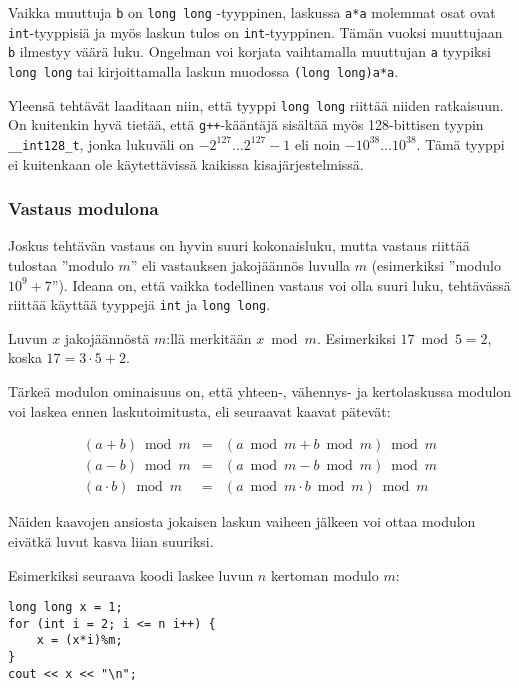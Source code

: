 Vaikka muuttuja \texttt{b} on \texttt{long long} -tyyppinen,
laskussa \texttt{a*a} molemmat osat ovat \texttt{int}-tyyppisiä
ja myös laskun tulos on \texttt{int}-tyyppinen.
Tämän vuoksi muuttujaan \texttt{b} ilmestyy väärä luku.
Ongelman voi korjata vaihtamalla muuttujan \texttt{a}
tyypiksi \texttt{long long} tai kirjoittamalla
laskun muodossa \texttt{(long long)a*a}.

Yleensä tehtävät laaditaan niin, että tyyppi
\texttt{long long} riittää niiden ratkaisuun.
On kuitenkin hyvä tietää, että \texttt{g++}-kääntäjä sisältää myös 128-bittisen
tyypin \texttt{\_\_int128\_t}, jonka lukuväli on
$-2^{127} \ldots 2^{127}-1$ eli noin $-10^{38} \ldots 10^{38}$.
Tämä tyyppi ei kuitenkaan ole käytettävissä kaikissa kisajärjestelmissä.

\subsubsection{Vastaus modulona}


Joskus tehtävän vastaus on hyvin suuri kokonaisluku,
mutta vastaus riittää tulostaa ''modulo $m$''
eli vastauksen jakojäännös luvulla $m$
(esimerkiksi ''modulo $10^9+7$'').
Ideana on, että vaikka todellinen vastaus
voi olla suuri luku,
tehtävässä riittää käyttää tyyppejä \texttt{int} ja \texttt{long long}.

Luvun $x$ jakojäännöstä $m$:llä
merkitään $x \bmod m$.
Esimerkiksi $17 \bmod 5 = 2$,
koska $17 = 3 \cdot 5 + 2$.

Tärkeä modulon ominaisuus on,
että yhteen-, vähennys- ja kertolaskussa
modulon voi laskea ennen laskutoimitusta,
eli seuraavat kaavat pätevät:

\[
\begin{array}{rcr}
(a+b) \bmod m & = & (a \bmod m + b \bmod m) \bmod m \\
(a-b) \bmod m & = & (a \bmod m - b \bmod m) \bmod m \\
(a \cdot b) \bmod m & = & (a \bmod m \cdot b \bmod m) \bmod m
\end{array}
\]

Näiden kaavojen ansiosta
jokaisen laskun vaiheen jälkeen voi ottaa modulon
eivätkä luvut kasva liian suuriksi.

Esimerkiksi seuraava koodi
laskee luvun $n$ kertoman modulo $m$:
\begin{lstlisting}
long long x = 1;
for (int i = 2; i <= n i++) {
    x = (x*i)%m;
}
cout << x << "\n";
\end{lstlisting}

